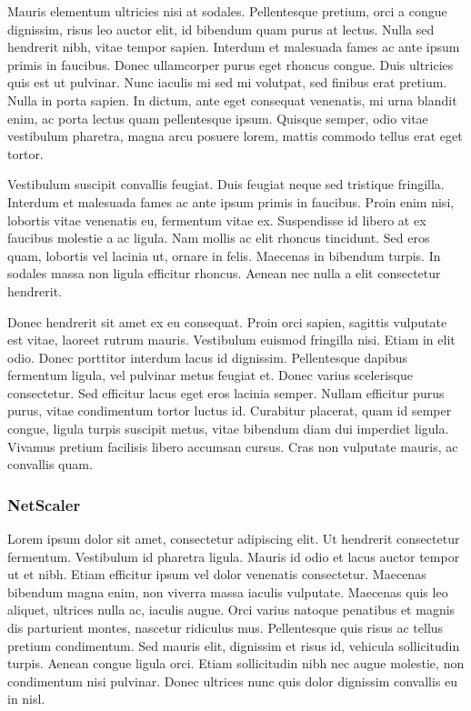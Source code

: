 \documentclass{report}
\begin{document}
Mauris elementum ultricies nisi at sodales. Pellentesque pretium, orci a congue dignissim, risus leo auctor elit, id bibendum quam purus at lectus. Nulla sed hendrerit nibh, vitae tempor sapien. Interdum et malesuada fames ac ante ipsum primis in faucibus. Donec ullamcorper purus eget rhoncus congue. Duis ultricies quis est ut pulvinar. Nunc iaculis mi sed mi volutpat, sed finibus erat pretium. Nulla in porta sapien. In dictum, ante eget consequat venenatis, mi urna blandit enim, ac porta lectus quam pellentesque ipsum. Quisque semper, odio vitae vestibulum pharetra, magna arcu posuere lorem, mattis commodo tellus erat eget tortor.

Vestibulum suscipit convallis feugiat. Duis feugiat neque sed tristique fringilla. Interdum et malesuada fames ac ante ipsum primis in faucibus. Proin enim nisi, lobortis vitae venenatis eu, fermentum vitae ex. Suspendisse id libero at ex faucibus molestie a ac ligula. Nam mollis ac elit rhoncus tincidunt. Sed eros quam, lobortis vel lacinia ut, ornare in felis. Maecenas in bibendum turpis. In sodales massa non ligula efficitur rhoncus. Aenean nec nulla a elit consectetur hendrerit.

Donec hendrerit sit amet ex eu consequat. Proin orci sapien, sagittis vulputate est vitae, laoreet rutrum mauris. Vestibulum euismod fringilla nisi. Etiam in elit odio. Donec porttitor interdum lacus id dignissim. Pellentesque dapibus fermentum ligula, vel pulvinar metus feugiat et. Donec varius scelerisque consectetur. Sed efficitur lacus eget eros lacinia semper. Nullam efficitur purus purus, vitae condimentum tortor luctus id. Curabitur placerat, quam id semper congue, ligula turpis suscipit metus, vitae bibendum diam dui imperdiet ligula. Vivamus pretium facilisis libero accumsan cursus. Cras non vulputate mauris, ac convallis quam.

\subsubsection{NetScaler}
Lorem ipsum dolor sit amet, consectetur adipiscing elit. Ut hendrerit consectetur fermentum. Vestibulum id pharetra ligula. Mauris id odio et lacus auctor tempor ut et nibh. Etiam efficitur ipsum vel dolor venenatis consectetur. Maecenas bibendum magna enim, non viverra massa iaculis vulputate. Maecenas quis leo aliquet, ultrices nulla ac, iaculis augue. Orci varius natoque penatibus et magnis dis parturient montes, nascetur ridiculus mus. Pellentesque quis risus ac tellus pretium condimentum. Sed mauris elit, dignissim et risus id, vehicula sollicitudin turpis. Aenean congue ligula orci. Etiam sollicitudin nibh nec augue molestie, non condimentum nisi pulvinar. Donec ultrices nunc quis dolor dignissim convallis eu in nisl.
\end{document}
